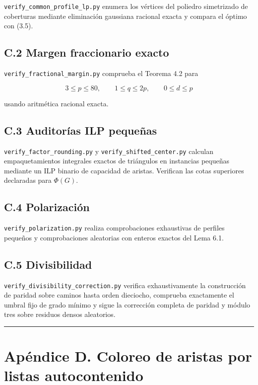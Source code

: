 \documentclass[
  11pt,
]{article}
\begin{document}
\texttt{verify\_common\_profile\_lp.py} enumera los vértices del
poliedro simetrizado de coberturas mediante eliminación gaussiana
racional exacta y compara el óptimo con (3.5).

\subsection{C.2 Margen fraccionario
exacto}\label{c.2-margen-fraccionario-exacto}

\texttt{verify\_fractional\_margin.py} comprueba el Teorema 4.2 para

\[
3\le p\le80,
\qquad
1\le q\le2p,
\qquad
0\le d\le p
\]

usando aritmética racional exacta.

\subsection{C.3 Auditorías ILP
pequeñas}\label{c.3-auditoruxedas-ilp-pequeuxf1as}

\texttt{verify\_factor\_rounding.py} y
\texttt{verify\_shifted\_center.py} calculan empaquetamientos integrales
exactos de triángulos en instancias pequeñas mediante un ILP binario de
capacidad de aristas. Verifican las cotas superiores declaradas para
\(\Phi(G)\).

\subsection{C.4 Polarización}\label{c.4-polarizaciuxf3n}

\texttt{verify\_polarization.py} realiza comprobaciones exhaustivas de
perfiles pequeños y comprobaciones aleatorias con enteros exactos del
Lema 6.1.

\subsection{C.5 Divisibilidad}\label{c.5-divisibilidad}

\texttt{verify\_divisibility\_correction.py} verifica exhaustivamente la
construcción de paridad sobre caminos hasta orden dieciocho, comprueba
exactamente el umbral fijo de grado mínimo y sigue la corrección
completa de paridad y módulo tres sobre residuos densos aleatorios.

\begin{center}\rule{0.5\linewidth}{0.5pt}\end{center}

\section{Apéndice D. Coloreo de aristas por listas
autocontenido}\label{apuxe9ndice-d.-coloreo-de-aristas-por-listas-autocontenido}
\end{document}
